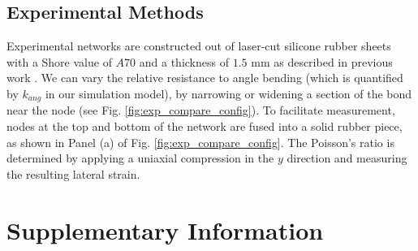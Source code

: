 \documentclass[9pt,twocolumn,twoside]{pnas-new}
\begin{document}
\subsection*{Experimental Methods}
Experimental networks are constructed out of laser-cut silicone rubber sheets with a Shore value of $A 70$ and a thickness of $1.5$ mm as described in previous work \cite{rocks2017designing}. We can vary the relative resistance to angle bending (which is quantified by $k_{ang}$ in our simulation model), by narrowing or widening a section of the bond near the node (see Fig. \ref{fig:exp_compare_config}).  To facilitate measurement, nodes at the top and bottom of the network are fused into a solid rubber piece, as shown in Panel (a) of Fig. \ref{fig:exp_compare_config}.  The Poisson's ratio is determined by applying a uniaxial compression in the $y$ direction and measuring the resulting lateral strain. 



\showacknow{} 





\pagebreak

\section*{Supplementary Information}
\end{document}
